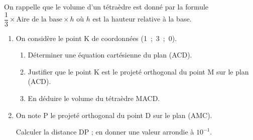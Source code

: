 On rappelle que le volume d'un tétraèdre est donné par la formule $\dfrac13 \times\text{Aire de la base}  \times h$ où $h$ est la hauteur relative à la base.

\begin{enumerate}[resume]
\item On considère le point K de coordonnées (1~;~3~;~0).
	\begin{enumerate}
		\item Déterminer une équation cartésienne du plan (ACD).
		\item Justifier que le point K est le projeté orthogonal du point M sur le plan (ACD).
		\item En déduire le volume du tétraèdre MACD.
	\end{enumerate}	
\item On note P le projeté orthogonal du point D sur le plan (AMC).

Calculer la distance DP ; en donner une valeur arrondie à $10^{-1}$.
\end{enumerate}
